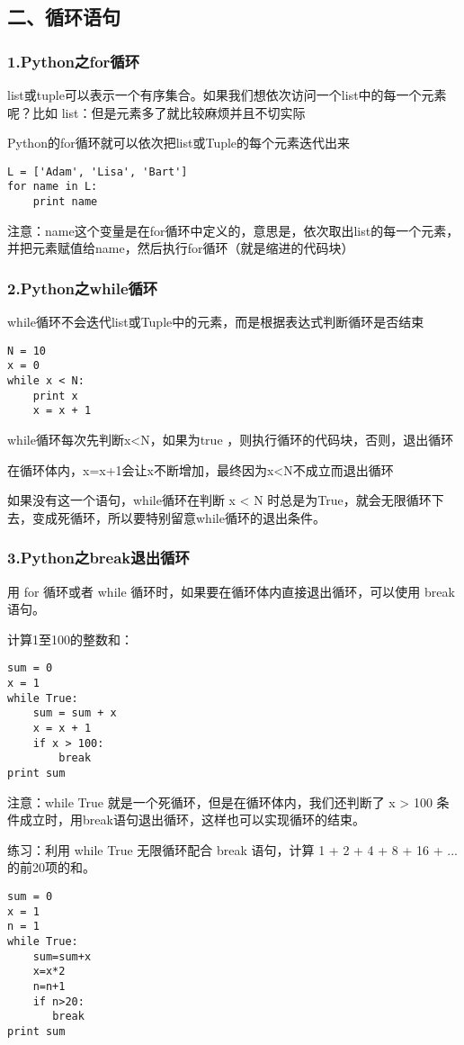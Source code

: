 \documentclass{article}
\begin{document}
\begin{CJK}{UTF8}{gbsn}
\part*{二、循环语句}
\section*{1.Python之for循环}
\subparagraph*{}
list或tuple可以表示一个有序集合。如果我们想依次访问一个list中的每一个元素呢？比如 list：但是元素多了就比较麻烦并且不切实际
\subparagraph*{}
Python的for循环就可以依次把list或Tuple的每个元素迭代出来
\begin{verbatim}
L = ['Adam', 'Lisa', 'Bart']
for name in L:
    print name
\end{verbatim}
\subparagraph*{}
注意：name这个变量是在for循环中定义的，意思是，依次取出list的每一个元素，并把元素赋值给name，然后执行for循环（就是缩进的代码块）
\section*{2.Python之while循环}
\subparagraph*{}
while循环不会迭代list或Tuple中的元素，而是根据表达式判断循环是否结束
\begin{verbatim}
N = 10
x = 0
while x < N:
    print x
    x = x + 1
\end{verbatim}
\subparagraph*{}
while循环每次先判断x<N，如果为true ，则执行循环的代码块，否则，退出循环
\subparagraph*{}
在循环体内，x=x+1会让x不断增加，最终因为x<N不成立而退出循环
\subparagraph*{}
如果没有这一个语句，while循环在判断 x < N 时总是为True，就会无限循环下去，变成死循环，所以要特别留意while循环的退出条件。
\section*{3.Python之break退出循环}
\subparagraph*{}
用 for 循环或者 while 循环时，如果要在循环体内直接退出循环，可以使用 break 语句。
\subparagraph*{}
计算1至100的整数和：
\begin{verbatim}
sum = 0
x = 1
while True:
    sum = sum + x
    x = x + 1
    if x > 100:
        break
print sum
\end{verbatim}
\subparagraph*{}
注意：while True 就是一个死循环，但是在循环体内，我们还判断了 x > 100 条件成立时，用break语句退出循环，这样也可以实现循环的结束。
\subparagraph*{}
练习：利用 while True 无限循环配合 break 语句，计算 1 + 2 + 4 + 8 + 16 + ... 的前20项的和。
\begin{verbatim}
sum = 0
x = 1
n = 1
while True:
    sum=sum+x
    x=x*2
    n=n+1
    if n>20:
       break
print sum
\end{verbatim}

\end{CJK}
\end{document}
